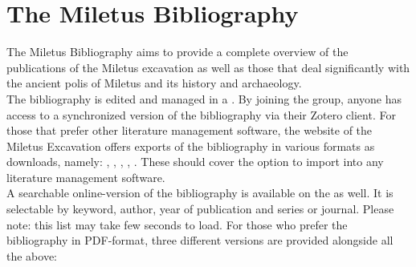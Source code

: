 \documentclass[a4paper]{scrartcl}
\newcommand{\redhref}[2]{\href{#1}{\color{uhhred}{#2}}}
\begin{document}
\thispagestyle{empty}

\section*{The Miletus Bibliography}

The Miletus Bibliography aims to provide a complete overview of the publications of the Miletus excavation as well as those that deal significantly with the ancient polis of Miletus and its history and archaeology.\\

The bibliography is edited and managed in a \redhref{https://www.zotero.org/groups/4475959/milet_bibliography}{publicly accessible Zotero group library}. By joining the group, anyone has access to a synchronized version of the bibliography via their Zotero client. For those that prefer other literature management software, the website of the Miletus Excavation offers exports of the bibliography in various formats as downloads, namely: \redhref{https://www.miletgrabung.uni-hamburg.de/material/bibliographie/downloads/milet-bibliography-biblatex.zip}{BibLaTeX}, \redhref{https://www.miletgrabung.uni-hamburg.de/material/bibliographie/downloads/milet-bibliography-bibtex.zip}{BibTeX}, \redhref{https://www.miletgrabung.uni-hamburg.de/material/bibliographie/downloads/milet-bibliography-csv.zip}{CSV}, \redhref{https://www.miletgrabung.uni-hamburg.de/material/bibliographie/downloads/milet-bibliography-endnote-xml.zip}{EndNote XML}, \redhref{https://www.miletgrabung.uni-hamburg.de/material/bibliographie/downloads/milet-bibliography-ris.zip}{RIS}. These should cover the option to import into any literature management software.\\

A searchable online-version of the bibliography is available on the \redhref{https://www.miletgrabung.uni-hamburg.de/material/bibliographie.html}{homepage of the Miletus Excavation} as well. It is selectable by keyword, author, year of publication and series or journal. Please note: this list may take few seconds to load. For those who prefer the bibliography in PDF-format, three different versions are provided alongside all the above: 
\end{document}
